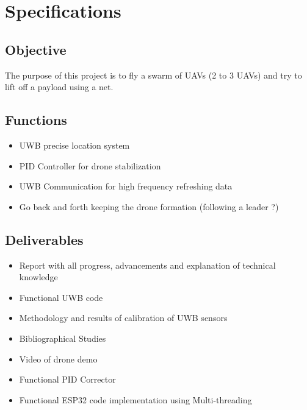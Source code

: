 \chapter*{Specifications}

\section*{Objective}
The purpose of this project is to fly a swarm of UAVs (2 to 3 UAVs) and try to lift off a payload using a net.
\section*{Functions}
\begin{itemize}

    \item UWB precise location system
    \item PID Controller for drone stabilization 
    \item UWB Communication for high frequency refreshing data
    \item Go back and forth keeping the drone formation (following a leader ?)

\end{itemize}

\section*{Deliverables}
\begin{itemize}

    \item Report with all progress, advancements and explanation of technical knowledge
    \item Functional UWB code 
    \item Methodology and results of calibration of UWB sensors
    \item Bibliographical Studies
    \item Video of drone demo 
    \item Functional PID Corrector
    \item Functional ESP32 code implementation using Multi-threading

\end{itemize}



\newpage
